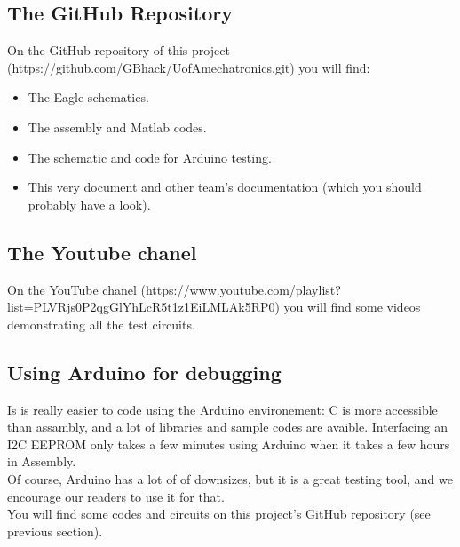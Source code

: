 \documentclass[12pt]{article}
\begin{document}
	\subsection{The GitHub Repository}

		On the GitHub repository of this project (https://github.com/GBhack/UofAmechatronics.git) you will find:
		\begin{itemize}
			\item The Eagle schematics.
			\item The assembly and Matlab codes.
			\item The schematic and code for Arduino testing.
			\item This very document and other team's documentation (which you should probably have a look).
		\end{itemize}

	\subsection{The Youtube chanel}

		On the YouTube chanel (https://www.youtube.com/playlist?list=PLVRjs0P2qgGlYhLcR5t1z1EiLMLAk5RP0) you will find some videos demonstrating all the test circuits.

	\subsection{Using Arduino for debugging}

		Is is really easier to code using the Arduino environement: C is more accessible than assambly, and a lot of libraries and sample codes are avaible.
		Interfacing an I2C EEPROM only takes a few minutes using Arduino when it takes a few hours in Assembly.\\
		Of course, Arduino has a lot of of downsizes, but it is a great testing tool, and we encourage our readers to use it for that.\\

		You will find some codes and circuits on this project's GitHub repository (see previous section).
\end{document}
